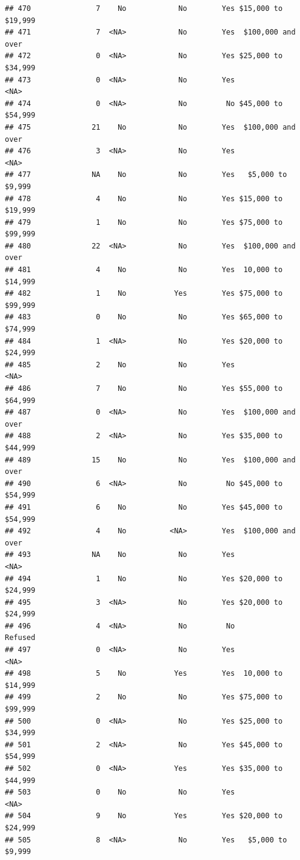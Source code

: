 \documentclass[man]{apa6}
\begin{document}
\begin{verbatim}
## 470               7    No            No        Yes $15,000 to $19,999
## 471               7  <NA>            No        Yes  $100,000 and over
## 472               0  <NA>            No        Yes $25,000 to $34,999
## 473               0  <NA>            No        Yes               <NA>
## 474               0  <NA>            No         No $45,000 to $54,999
## 475              21    No            No        Yes  $100,000 and over
## 476               3  <NA>            No        Yes               <NA>
## 477              NA    No            No        Yes   $5,000 to $9,999
## 478               4    No            No        Yes $15,000 to $19,999
## 479               1    No            No        Yes $75,000 to $99,999
## 480              22  <NA>            No        Yes  $100,000 and over
## 481               4    No            No        Yes  10,000 to $14,999
## 482               1    No           Yes        Yes $75,000 to $99,999
## 483               0    No            No        Yes $65,000 to $74,999
## 484               1  <NA>            No        Yes $20,000 to $24,999
## 485               2    No            No        Yes               <NA>
## 486               7    No            No        Yes $55,000 to $64,999
## 487               0  <NA>            No        Yes  $100,000 and over
## 488               2  <NA>            No        Yes $35,000 to $44,999
## 489              15    No            No        Yes  $100,000 and over
## 490               6  <NA>            No         No $45,000 to $54,999
## 491               6    No            No        Yes $45,000 to $54,999
## 492               4    No          <NA>        Yes  $100,000 and over
## 493              NA    No            No        Yes               <NA>
## 494               1    No            No        Yes $20,000 to $24,999
## 495               3  <NA>            No        Yes $20,000 to $24,999
## 496               4  <NA>            No         No            Refused
## 497               0  <NA>            No        Yes               <NA>
## 498               5    No           Yes        Yes  10,000 to $14,999
## 499               2    No            No        Yes $75,000 to $99,999
## 500               0  <NA>            No        Yes $25,000 to $34,999
## 501               2  <NA>            No        Yes $45,000 to $54,999
## 502               0  <NA>           Yes        Yes $35,000 to $44,999
## 503               0    No            No        Yes               <NA>
## 504               9    No           Yes        Yes $20,000 to $24,999
## 505               8  <NA>            No        Yes   $5,000 to $9,999

\end{verbatim}
\end{document}
